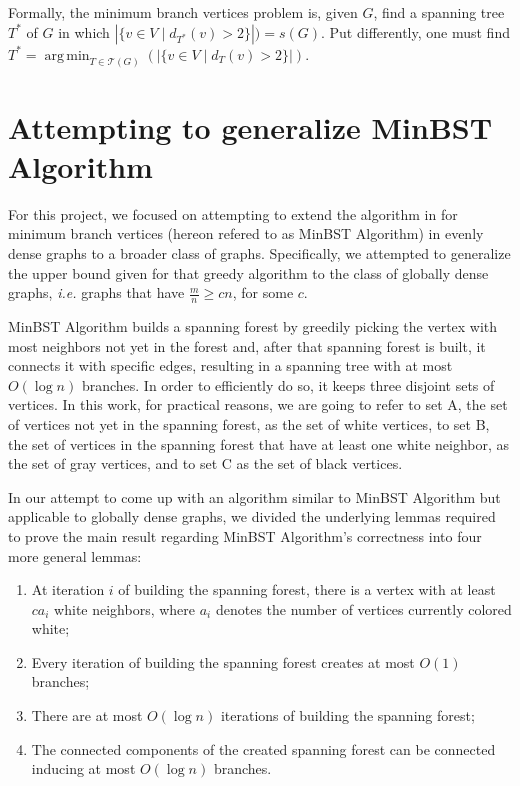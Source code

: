 \documentclass[12pt]{article}
\DeclareMathOperator*{\argmin}{arg\,min}
\begin{document}
Formally, the minimum branch vertices problem is, given $G$, find a spanning tree $T^*$ of $G$ in which $|\{v \in V \mid d_{T^*}(v) > 2 \}|) = s(G)$.
Put differently, one must find $T^* = \argmin_{T \in \mathcal{T}(G)}(|\{ v \in V \mid d_T(v) > 2\}|)$.

\section{Attempting to generalize MinBST Algorithm} \label{sec:methods}

For this project, we focused on attempting to extend the algorithm in \cite{salamon2010} for minimum branch vertices (hereon refered to as MinBST Algorithm) in evenly dense graphs to a broader class of graphs.
Specifically, we attempted to generalize the upper bound given for that greedy algorithm to the class of globally dense graphs, \emph{i.e.} graphs that have $\frac{m}{n} \ge cn$, for some $c$.

MinBST Algorithm builds a spanning forest by greedily picking the vertex with most neighbors not yet in the forest and, after that spanning forest is built, it connects it with specific edges, resulting in a spanning tree with at most $O(\log n)$ branches.
In order to efficiently do so, it keeps three disjoint sets of vertices.
In this work, for practical reasons, we are going to refer to set A, the set of vertices not yet in the spanning forest, as the set of white vertices, to set B, the set of vertices in the spanning forest that have at least one white neighbor, as the set of gray vertices, and to set C as the set of black vertices.

In our attempt to come up with an algorithm similar to MinBST Algorithm but applicable to globally dense graphs, we divided the underlying lemmas required to prove the main result regarding MinBST Algorithm's correctness into four more general lemmas:

\begin{enumerate}
  \item At iteration $i$ of building the spanning forest, there is a vertex with at least $ca_i$ white neighbors, where $a_i$ denotes the number of vertices currently colored white;
  \item Every iteration of building the spanning forest creates at most $O(1)$ branches;
  \item There are at most $O(\log n)$ iterations of building the spanning forest;
  \item The connected components of the created spanning forest can be connected inducing at most $O(\log n)$ branches.
\end{enumerate}
\end{document}

